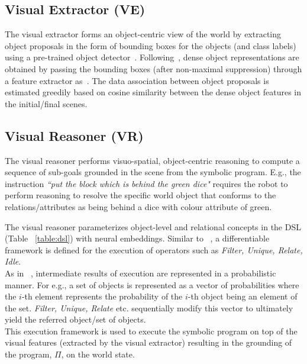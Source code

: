 
\subsection{Visual Extractor (VE)}
\label{subsec:visual-reason}
The visual extractor forms an object-centric view of the world by extracting object proposals in the form of bounding boxes for the objects (and class labels) 
using a pre-trained object detector~\cite{redmon2016you}. 
%
Following~\cite{Mao2019NeuroSymbolic}, dense object representations are obtained by passing the bounding boxes (after non-maximal suppression) through a feature extractor as~\cite{targ2016resnet}. 
The data association between object proposals is estimated greedily based on cosine similarity between the dense object features in the initial/final scenes. 

\subsection{Visual Reasoner (VR)}
%
The visual reasoner performs visuo-spatial, object-centric reasoning to compute a sequence of sub-goals grounded in the scene from the symbolic program.
%
E.g., the instruction \textit{``put the block which is behind the green dice"} requires the robot to perform reasoning to resolve the specific world object that conforms to the relations/attributes as being behind a dice with colour attribute of green. 

The visual reasoner parameterizes object-level and relational concepts in the DSL (Table ~\ref{table:dsl}) with neural embeddings. Similar to ~\cite{Mao2019NeuroSymbolic}, a differentiable framework is defined for the execution of operators such as \emph{Filter, Unique, Relate, Idle}.  \\ 
%
As in ~\cite{Mao2019NeuroSymbolic}, intermediate results of execution are represented in a probabilistic manner. For e.g., a set of objects is represented as a vector of probabilities where the $i$-th element represents the probability of the $i$-th object being an element of the set. \emph{Filter, Unique, Relate} etc. sequentially modify this vector to ultimately yield the referred object/set of objects.  \\ 
%
This execution framework is used to execute the symbolic program  on top of the visual features (extracted by the visual extractor) resulting in the grounding of the program, $\Pi$, on the world state.


